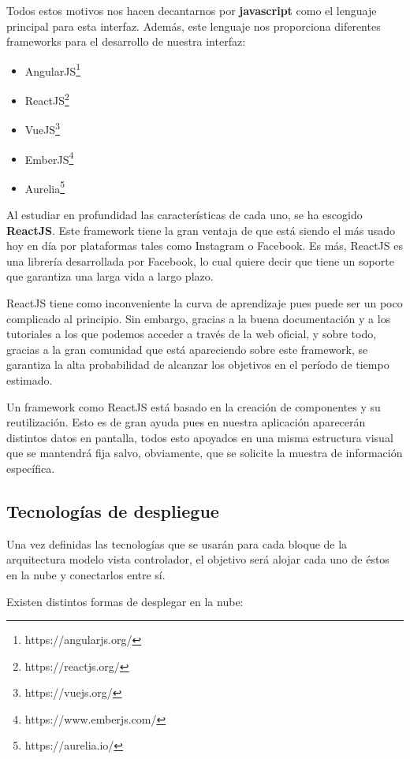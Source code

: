 Todos estos motivos nos hacen decantarnos por \textbf{javascript} como el lenguaje principal para esta interfaz. Además, este lenguaje nos proporciona diferentes frameworks para el desarrollo de nuestra interfaz\cite{framework}:

\begin{itemize}
    \item AngularJS\footnote{https://angularjs.org/}
    \item ReactJS\footnote{https://reactjs.org/}
    \item VueJS\footnote{https://vuejs.org/}
    \item EmberJS\footnote{https://www.emberjs.com/}
    \item Aurelia\footnote{https://aurelia.io/}
\end{itemize}

Al estudiar en profundidad las características de cada uno\cite{framework2}, se ha escogido \textbf{ReactJS}. Este framework tiene la gran ventaja de que está siendo el más usado hoy en día por plataformas tales como Instagram o Facebook. Es más, ReactJS es una librería desarrollada por Facebook, lo cual quiere decir que tiene un soporte que garantiza una larga vida a largo plazo.

ReactJS tiene como inconveniente la curva de aprendizaje pues puede ser un poco complicado al principio. Sin embargo, gracias a la buena documentación y a los tutoriales a los que podemos acceder a través de la web oficial, y sobre todo, gracias a la gran comunidad que está apareciendo sobre este framework, se garantiza la alta probabilidad de alcanzar los objetivos en el período de tiempo estimado.

Un framework como ReactJS está basado en la creación de componentes y su reutilización. Esto es de gran ayuda pues en nuestra aplicación aparecerán distintos datos en pantalla, todos esto apoyados en una misma estructura visual que se mantendrá fija salvo, obviamente, que se solicite la muestra de información específica.

\subsection{Tecnologías de despliegue}

Una vez definidas las tecnologías que se usarán para cada bloque de la arquitectura modelo vista controlador, el objetivo será alojar cada uno de éstos en la nube y conectarlos entre sí. 

Existen distintos formas de desplegar en la nube\cite{cloud}\cite{cloud2}\cite{cloud3}\cite{cloud4}:

